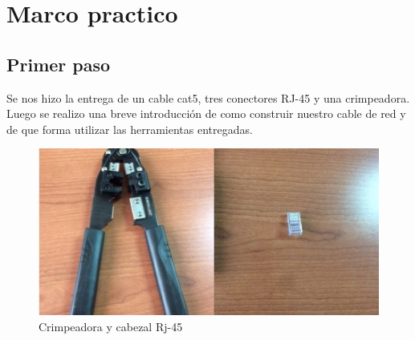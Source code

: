\documentclass[spanish]{udpreport}
\begin{document}
\chapter{Marco practico}
\section{Primer paso}
Se nos hizo la entrega de un cable cat5, tres conectores RJ-45 y una crimpeadora. Luego se realizo una breve introducción de como construir nuestro cable de red y de que forma utilizar las herramientas entregadas.
\begin{figure}[h]
    \centering
    \includegraphics[scale=0.3]{images/1.jpg}
    \caption{Crimpeadora y cabezal Rj-45}
    \label{fig:my_label}
\end{figure}
\end{document}
